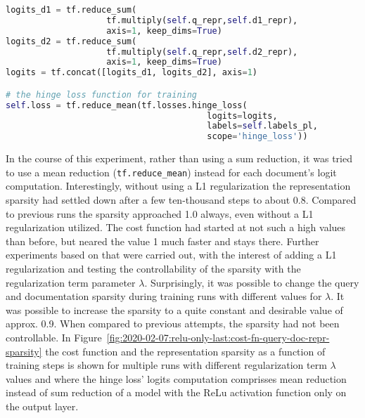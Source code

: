 \begin{lstlisting}[language=Python,frame=single,breaklines=true,float=tbh,caption=Logits computation for loss in SNRM TensorFlow implementation,label=tensorflow-logits-computation]
logits_d1 = tf.reduce_sum(
                    tf.multiply(self.q_repr,self.d1_repr),
                    axis=1, keep_dims=True)
logits_d2 = tf.reduce_sum(
                    tf.multiply(self.q_repr,self.d2_repr),
                    axis=1, keep_dims=True)
logits = tf.concat([logits_d1, logits_d2], axis=1)

# the hinge loss function for training
self.loss = tf.reduce_mean(tf.losses.hinge_loss(
                                        logits=logits, 
                                        labels=self.labels_pl, 
                                        scope='hinge_loss'))
\end{lstlisting}

In the course of this experiment, rather than using a sum reduction, it was tried to use
    a mean reduction (\texttt{tf.reduce\_mean}) instead for each document's logit computation.
Interestingly, without using a L1 regularization the representation sparsity had settled down after
    a few ten-thousand steps to about 0.8.
Compared to previous runs the sparsity approached 1.0 always, even without a L1 regularization utilized.
The cost function had started at not such a high values than before, but neared the value 1 much faster 
    and stays there.
Further experiments based on that were carried out, with the interest of adding a L1 regularization 
    and testing the controllability of the sparsity with the regularization term parameter $\lambda$.
Surprisingly, it was possible to change the query and documentation sparsity during training runs
    with different values for $\lambda$.
It was possible to increase the sparsity to a quite constant and desirable value of approx. 0.9.
When compared to previous attempts, the sparsity had not been controllable.
In Figure~\ref{fig:2020-02-07:relu-only-last:cost-fn-query-doc-repr-sparsity} 
    the cost function and the representation sparsity as a function of training steps is shown
    for multiple runs with different regularization term $\lambda$ values
    and where the hinge loss' logits computation comprisses mean reduction instead of sum reduction
    of a model with the ReLu activation function only on the output layer.

